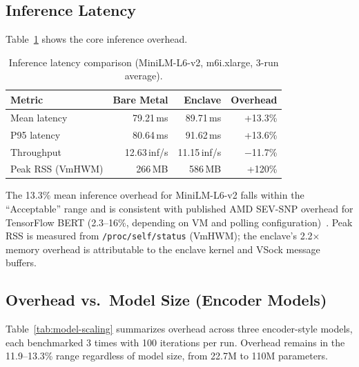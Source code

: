 \documentclass[11pt,a4paper]{article}
\newcommand{\BenchInstance}{m6i.xlarge}
\newcommand{\BenchModelName}{MiniLM-L6-v2}
\newcommand{\BenchNumRuns}{3}
\newcommand{\BenchBareMeanMs}{79.21}
\newcommand{\BenchEnclaveMeanMs}{89.71}
\newcommand{\BenchOverheadPct}{13.3\%}
\newcommand{\BenchBarePNinetyFiveMs}{80.64}
\newcommand{\BenchEnclavePNinetyFiveMs}{91.62}
\newcommand{\BenchBareThroughput}{12.63}
\newcommand{\BenchEnclaveThroughput}{11.15}
\newcommand{\BenchBarePeakRssMb}{266}
\newcommand{\BenchEnclavePeakRssMb}{586}
\newcommand{\BenchOverheadRange}{11.9--13.3\%}
\begin{document}
\subsection{Inference Latency}

Table~\ref{tab:inference} shows the core inference overhead.

\begin{table}[ht]
\centering
\caption{Inference latency comparison (\BenchModelName{}, \BenchInstance{}, \BenchNumRuns{}-run average).}
\label{tab:inference}
\begin{tabular}{lrrr}
\hline
\textbf{Metric} & \textbf{Bare Metal} & \textbf{Enclave} & \textbf{Overhead} \\
\hline
Mean latency     & \BenchBareMeanMs{}\,ms  & \BenchEnclaveMeanMs{}\,ms  & +\BenchOverheadPct{} \\
P95 latency      & \BenchBarePNinetyFiveMs{}\,ms  & \BenchEnclavePNinetyFiveMs{}\,ms  & +13.6\% \\
Throughput       & \BenchBareThroughput{}\,inf/s & \BenchEnclaveThroughput{}\,inf/s & $-$11.7\% \\
Peak RSS (VmHWM) & \BenchBarePeakRssMb{}\,MB    & \BenchEnclavePeakRssMb{}\,MB & +120\% \\
\hline
\end{tabular}
\end{table}

The \BenchOverheadPct{} mean inference overhead for \BenchModelName{} falls within the ``Acceptable'' range and is consistent with published AMD SEV-SNP overhead for TensorFlow BERT (2.3--16\%, depending on VM and polling configuration)~\cite{misono2024}.
Peak RSS is measured from \texttt{/proc/self/status} (VmHWM); the enclave's 2.2$\times$ memory overhead is attributable to the enclave kernel and VSock message buffers.

\subsection{Overhead vs.\ Model Size (Encoder Models)}

Table~\ref{tab:model-scaling} summarizes overhead across three encoder-style models,
each benchmarked \BenchNumRuns{} times with 100 iterations per run.
Overhead remains in the \BenchOverheadRange{} range regardless of model size, from 22.7M to 110M parameters.
\end{document}
